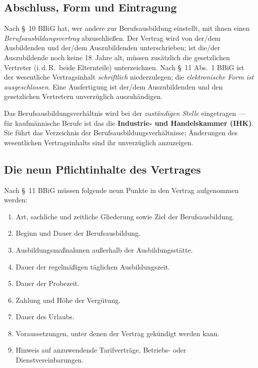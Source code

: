 \documentclass[11pt, a4paper]{article}
\begin{document}
\subsection{Abschluss, Form und Eintragung}

Nach \S~10 BBiG hat, wer andere zur Berufsausbildung einstellt, mit ihnen einen
\emph{Berufsausbildungsvertrag} abzuschließen. Der Vertrag wird von der/dem Ausbildenden und
der/dem Auszubildenden unterschrieben; ist die/der Auszubildende noch keine 18~Jahre alt,
müssen zusätzlich die gesetzlichen Vertreter (i.\,d.\,R.\ beide Elternteile) unterzeichnen.
Nach \S~11 Abs.~1 BBiG ist der wesentliche Vertragsinhalt \emph{schriftlich} niederzulegen;
die \emph{elektronische Form ist ausgeschlossen}. Eine Ausfertigung ist der/dem Auszubildenden
und den gesetzlichen Vertretern unverzüglich auszuhändigen.

Das Berufsausbildungsverhältnis wird bei der \emph{zuständigen Stelle} eingetragen --- für
kaufmännische Berufe ist das die \textbf{Industrie- und Handelskammer (IHK)}. Sie führt das
Verzeichnis der Berufsausbildungsverhältnisse; Änderungen des wesentlichen Vertragsinhalts
sind ihr unverzüglich anzuzeigen.

\subsection{Die neun Pflichtinhalte des Vertrages}

Nach \S~11 BBiG müssen folgende neun Punkte in den Vertrag aufgenommen werden:

\begin{enumerate}
  \item Art, sachliche und zeitliche Gliederung sowie Ziel der Berufsausbildung.
  \item Beginn und Dauer der Berufsausbildung.
  \item Ausbildungsmaßnahmen außerhalb der Ausbildungsstätte.
  \item Dauer der regelmäßigen täglichen Ausbildungszeit.
  \item Dauer der Probezeit.
  \item Zahlung und Höhe der Vergütung.
  \item Dauer des Urlaubs.
  \item Voraussetzungen, unter denen der Vertrag gekündigt werden kann.
  \item Hinweis auf anzuwendende Tarifverträge, Betriebs- oder Dienstvereinbarungen.
\end{enumerate}
\end{document}
